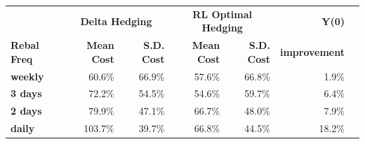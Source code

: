 \documentclass{article}
\begin{document}
\begin{table}[htbp]
\centering
\vspace{0.4em}
\begin{tabular}{lrrrrrr}
\hline
 & \multicolumn{2}{c}{\textbf{Delta Hedging}} & \multicolumn{2}{c}{\textbf{RL Optimal Hedging}} & \textbf{Y(0)} \\
\textbf{Rebal Freq} & \textbf{Mean Cost} & \textbf{S.D. Cost} & \textbf{Mean Cost} & \textbf{S.D. Cost} & \textbf{improvement} \\
\hline
\textbf{weekly} & 60.6\% & 66.9\% & 57.6\% & 66.8\% & 1.9\% \\
\textbf{3 days} & 72.2\% & 54.5\% & 54.6\% & 59.7\% & 6.4\% \\
\textbf{2 days} & 79.9\% & 47.1\% & 66.7\% & 48.0\% & 7.9\% \\
\textbf{daily} & 103.7\% & 39.7\% & 66.8\% & 44.5\% & 18.2\% \\
\hline
\end{tabular}
\end{table}
\end{document}
